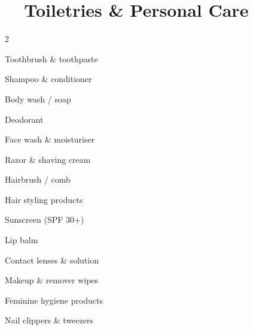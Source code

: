 \section{\faBath\ \ Toiletries \& Personal Care}

\begin{multicols}{2}
\begin{checklist}
  \item Toothbrush \& toothpaste
  \item Shampoo \& conditioner
  \item Body wash / soap
  \item Deodorant
  \item Face wash \& moisturiser
  \item Razor \& shaving cream
  \item Hairbrush / comb
  \item Hair styling products
  \item Sunscreen (SPF 30+)
  \item Lip balm
  \item Contact lenses \& solution
  \item Makeup \& remover wipes
  \item Feminine hygiene products
  \item Nail clippers \& tweezers
\end{checklist}
\end{multicols}

